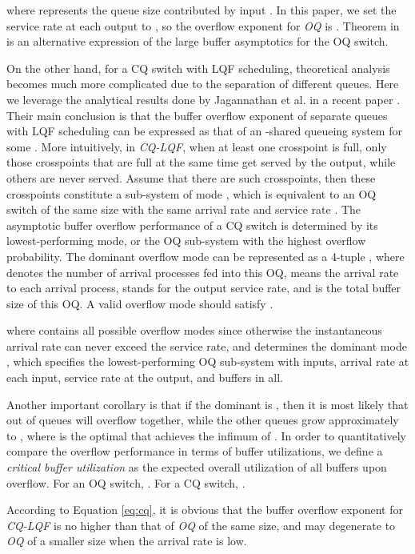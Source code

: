 \documentclass[journal,final,doublecolumn,10pt,twoside]{IEEEtranTCOM} \normalsize
\begin{document}
where  represents the queue size contributed by input . In this paper, we set the service rate at each output to , so the overflow exponent for \emph{OQ} is . Theorem  in \cite{cqs} is an alternative expression of the large buffer asymptotics for the OQ switch.

On the other hand, for a CQ switch with LQF scheduling, theoretical analysis becomes much more complicated due to the separation of different queues. Here we leverage the analytical results done by Jagannathan et al. in a recent paper \cite{lqfoverflow}. Their main conclusion is that the buffer overflow exponent of  separate queues with LQF scheduling can be expressed as that of an -shared queueing system for some . More intuitively, in \emph{CQ-LQF}, when at least one crosspoint is full, only those crosspoints that are full at the same time get served by the output, while others are never served. Assume that there are  such crosspoints, then these crosspoints constitute a sub-system of mode , which is equivalent to an OQ switch of the same size with the same arrival rate  and service rate . The asymptotic buffer overflow performance of a CQ switch is determined by its lowest-performing mode, or the OQ sub-system with the highest overflow probability. The dominant overflow mode can be represented as a 4-tuple , where  denotes the number of arrival processes fed into this OQ,  means the arrival rate to each arrival process,  stands for the output service rate, and  is the total buffer size of this OQ. A valid overflow mode should satisfy .

where  contains all possible overflow modes since otherwise the instantaneous arrival rate can never exceed the service rate, and  determines the dominant mode , which specifies the lowest-performing OQ sub-system with  inputs, arrival rate  at each input, service rate  at the output, and  buffers in all.


Another important corollary is that if the dominant  is , then it is most likely that  out of  queues will overflow together, while the other  queues grow approximately to , where  is the optimal  that achieves the infimum of . In order to quantitatively compare the overflow performance in terms of buffer utilizations, we define a \emph{critical buffer utilization}  as the expected overall utilization of all buffers upon overflow. For an OQ switch, . For a CQ switch, .

According to Equation \ref{eq:cq}, it is obvious that the buffer overflow exponent for \emph{CQ-LQF} is no higher than that of \emph{OQ} of the same size, and may degenerate to \emph{OQ} of a smaller size  when the arrival rate is low. 
\end{document}
